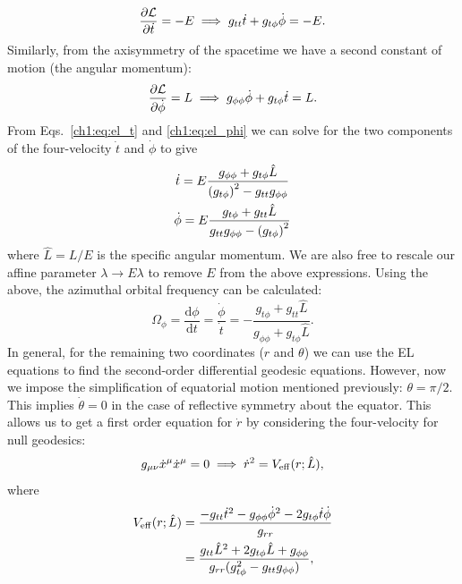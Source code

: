 \begin{equation}\label{ch1:eq:el_t} 
    \pdv{\mathcal{L}}{\dot{t}} = -E \implies g_{tt}\dot{t} + g_{t\phi}\dot{\phi} = -E.
\end{equation}
Similarly, from the axisymmetry of the spacetime we have a second constant of motion (the angular momentum):
\begin{equation}\label{ch1:eq:el_phi}
    \pdv{\mathcal{L}}{\dot{\phi}} =L \implies g_{\phi \phi}\dot{\phi} + g_{t\phi}\dot{t} = L.
\end{equation}
From Eqs.~\ref{ch1:eq:el_t} and \ref{ch1:eq:el_phi} we can solve for the two components of the four-velocity $\dot{t}$ and $\dot{\phi}$ to give
\begin{gather}
    \label{ch1:eq:tdot_L}
    \dot{t} = E \frac{g_{\phi \phi} + g_{t \phi}\hat{L}}{\qty(g_{t \phi})^2 - g_{t t}g_{\phi \phi}} \\
    \label{ch1:eq:phidot_L}
    \dot{\phi} = E \frac{g_{t \phi} + g_{t t}\hat{L}}{g_{t t}g_{\phi \phi} - \qty(g_{t \phi})^2}
\end{gather}
where $\hat{L} = L/E$ is the specific angular momentum.
We are also free to rescale our affine parameter $\lambda\rightarrow E\lambda$ to remove $E$ from the above expressions.
Using the above, the azimuthal orbital frequency can be calculated:
\begin{equation}
    \Omega_\phi = \frac{\mathrm{d}\phi}{\mathrm{d}t} =  \frac{\dot{\phi}}{\dot{t}} = -\frac{g_{t\phi}+g_{tt}\hat{L}}{g_{\phi\phi}+g_{t\phi}\hat{L}}.
\end{equation}
In general, for the remaining two coordinates ($r$ and $\theta$) we can use the EL equations to find the second-order differential geodesic equations.
However, now we impose the simplification of equatorial motion mentioned previously: $\theta=\pi/2$.
This implies $\dot{\theta}=0$ in the case of reflective symmetry about the equator. 
This allows us to get a first order equation for $\dot{r}$ by considering the four-velocity for null geodesics:
\begin{equation}\label{ch1:eq:rdot}
    g_{\mu\nu}\dot{x}^\mu\dot{x}^\mu = 0 \implies \dot{r}^2 = V_{\rm eff}(r;\hat{L}),
\end{equation}
where
\begin{align}\label{ch1:eq:veff}
    V_{\rm eff}(r;\hat{L}) &= \frac{-g_{tt}\dot{t}^2 -g_{\phi\phi}\dot{\phi}^2-2g_{t\phi}\dot{t}\dot{\phi} }{g_{rr}} \nonumber \\
    &= \frac{g_{tt} \hat{L}^2+2 g_{t\phi } \hat{L}+g_{\phi\phi}}{g_{rr}(g_{t\phi}^2-g_{tt} g_{\phi \phi})},
\end{align}
